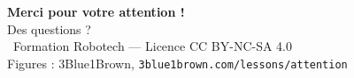 \documentclass[
	11pt,
	aspectratio=169
]{beamer}
\begin{document}
\begin{frame}
    \begin{center}
        \Huge \textbf{Merci pour votre attention !} \\
        \bigskip
        \large Des questions ? \\
        \bigskip
        \small \ccbyncsa\ Formation Robotech --- Licence CC BY-NC-SA 4.0 \\
        \small Figures : 3Blue1Brown, \texttt{3blue1brown.com/lessons/attention}
    \end{center}
\end{frame}
\end{document}
